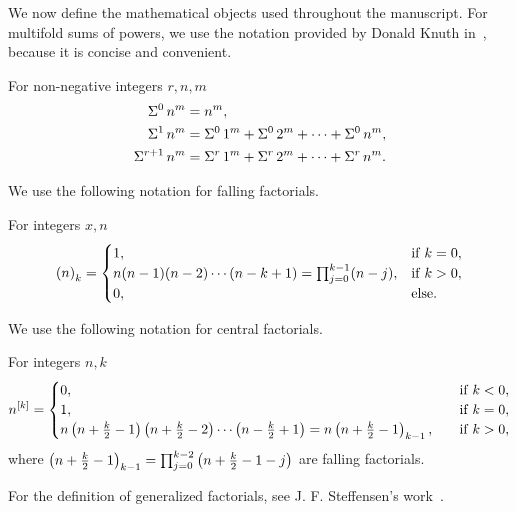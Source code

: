 We now define the mathematical objects used throughout the manuscript.
For multifold sums of powers, we use the notation provided by Donald Knuth in~\cite{knuth1993johann},
because it is concise and convenient.
\begin{definition} 
  \label{def:multifold-sums-of-powers-recurrence}
  For non-negative integers $r,n,m$
  \begin{align*}
    \Sigma^{0}\,{n}^{m}   &= n^m, \\
    \Sigma^{1}\,{n}^{m}   &= \Sigma^{0}\,{1}^{m}
    + \Sigma^{0}\,{2}^{m} + \cdots + \Sigma^{0}\,{n}^{m}, \\
    \Sigma^{r+1}\,{n}^{m} &= \Sigma^{r}\,{1}^{m}
    + \Sigma^{r}\,{2}^{m} + \cdots + \Sigma^{r}\,{n}^{m}.
  \end{align*}
\end{definition}
We use the following notation for falling factorials.
\begin{definition}  For integers $x,n$
  \begin{align*}
    \left(n\right)_{k} =
    \begin{cases}
      1, & \mathrm{if \; } k = 0, \\
      n(n-1)(n-2)\cdots(n-k+1) = \prod_{j=0}^{k-1} (n-j), & \mathrm{if \; } k > 0, \\
      0, & \mathrm{else}.
    \end{cases}
  \end{align*}
\end{definition}
We use the following notation for central factorials.
\begin{definition}
  \label{def:central-factorials}
  For integers $n,k$
  \begin{align*}
    n^{[k]} =
    \begin{cases}
      0, \quad & \mathrm{if \; } k < 0, \\
      1, \quad & \mathrm{if \; } k = 0, \\
      n \left( n + \frac{k}{2} -1 \right)\left( n + \frac{k}{2} -2 \right)
      \cdots \left( n - \frac{k}{2} +1 \right)
      = n \left(n+\frac{k}{2}-1\right)_{k-1}, \quad & \mathrm{if \; } k>0,
    \end{cases}
  \end{align*}
  where
  $\left(n+\frac{k}{2}-1\right)_{k-1}
  = \prod_{j=0}^{k-2} \left( n+\frac{k}{2}-1 -j \right)$
  are falling factorials.
\end{definition}
For the definition of generalized factorials, see J. F. Steffensen's work~\cite{steffensen1933definition}.
